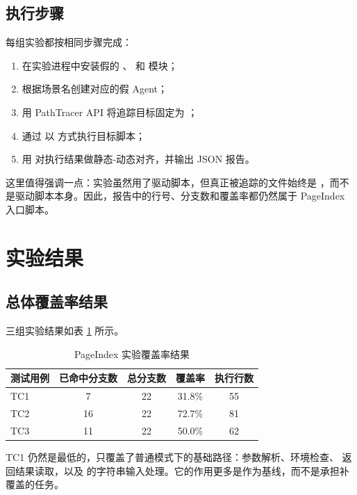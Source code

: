 \subsection{执行步骤}

每组实验都按相同步骤完成：

\begin{enumerate}
    \item 在实验进程中安装假的 、 和  模块；
    \item 根据场景名创建对应的假 Agent；
    \item 用 PathTracer API 将追踪目标固定为 ；
    \item 通过  以  方式执行目标脚本；
    \item 用  对执行结果做静态-动态对齐，并输出 JSON 报告。
\end{enumerate}

这里值得强调一点：实验虽然用了驱动脚本，但真正被追踪的文件始终是 ，而不是驱动脚本本身。因此，报告中的行号、分支数和覆盖率都仍然属于 PageIndex 入口脚本。

\section{实验结果}

\subsection{总体覆盖率结果}

三组实验结果如表 \ref{tab:pageindex-coverage} 所示。

\begin{table}[htbp]
    \centering
    \caption{PageIndex 实验覆盖率结果}
    \label{tab:pageindex-coverage}
    \begin{tabular}{lcccc}
        \toprule
        测试用例 & 已命中分支数 & 总分支数 & 覆盖率 & 执行行数 \\
        \midrule
        TC1 & 7 & 22 & 31.8\% & 55 \\
        TC2 & 16 & 22 & 72.7\% & 81 \\
        TC3 & 11 & 22 & 50.0\% & 62 \\
        \bottomrule
    \end{tabular}
\end{table}

TC1 仍然是最低的，只覆盖了普通模式下的基础路径：参数解析、环境检查、 返回结果读取，以及  的字符串输入处理。它的作用更多是作为基线，而不是承担补覆盖的任务。

